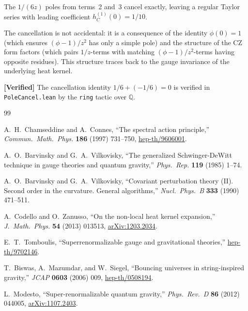 \documentclass[11pt,a4paper]{article}
\theoremstyle{plain}
\theoremstyle{definition}
\newcommand{\verified}[1]{%
  \par\smallskip\noindent
  \colorbox{green!10}{\parbox{\dimexpr\linewidth-2\fboxsep}{%
    \textcolor{green!50!black}{\textbf{[Verified]}} #1}}%
  \par\smallskip}
\begin{document}
The $1/(6z)$ poles from terms~2 and~3 cancel exactly, leaving a
regular Taylor series with leading coefficient $h_C^{(1)}(0) = 1/10$.

The cancellation is not accidental: it is a consequence of the
identity $\phi(0) = 1$ (which ensures $(\phi-1)/z^2$ has only a
simple pole) and the structure of the CZ form factors (which pairs
$1/z$-terms with matching $(\phi-1)/z^2$-terms having opposite
residues). This structure traces back to the gauge invariance of
the underlying heat kernel.

\verified{The cancellation identity $1/6 + (-1/6) = 0$ is verified
in \texttt{PoleCancel.lean} by the \texttt{ring} tactic over $\mathbb{Q}$.}

\begin{thebibliography}{99}

A.~H.~Chamseddine and A.~Connes,
``The spectral action principle,''
\emph{Commun.\ Math.\ Phys.} \textbf{186} (1997) 731--750,
\href{https://arxiv.org/abs/hep-th/9606001}{hep-th/9606001}.

A.~O.~Barvinsky and G.~A.~Vilkovisky,
``The generalized Schwinger-DeWitt technique in gauge theories and
quantum gravity,''
\emph{Phys.\ Rep.} \textbf{119} (1985) 1--74.

A.~O.~Barvinsky and G.~A.~Vilkovisky,
``Covariant perturbation theory (II). Second order in the curvature.
General algorithms,''
\emph{Nucl.\ Phys.\ B} \textbf{333} (1990) 471--511.

A.~Codello and O.~Zanusso,
``On the non-local heat kernel expansion,''
\emph{J.\ Math.\ Phys.} \textbf{54} (2013) 013513,
\href{https://arxiv.org/abs/1203.2034}{arXiv:1203.2034}.

E.~T.~Tomboulis,
``Superrenormalizable gauge and gravitational theories,''
\href{https://arxiv.org/abs/hep-th/9702146}{hep-th/9702146}.

T.~Biswas, A.~Mazumdar, and W.~Siegel,
``Bouncing universes in string-inspired gravity,''
\emph{JCAP} \textbf{0603} (2006) 009,
\href{https://arxiv.org/abs/hep-th/0508194}{hep-th/0508194}.

L.~Modesto,
``Super-renormalizable quantum gravity,''
\emph{Phys.\ Rev.\ D} \textbf{86} (2012) 044005,
\href{https://arxiv.org/abs/1107.2403}{arXiv:1107.2403}.


\end{thebibliography}
\end{document}

